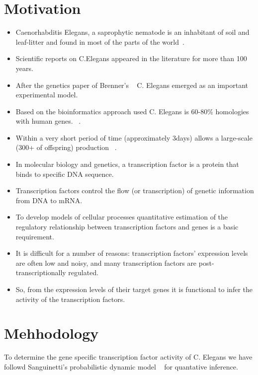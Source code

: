 \documentclass[12pt]{article}
\begin{document}
\maketitle


\section{Motivation}
	\begin{itemize}
	  \item Caenorhabditis Elegans, a saprophytic nematode is an inhabitant of soil and leaf-litter and found 
		in most of the parts of the world~\cite{hope}.
	  \item Scientific reports on C.Elegans appeared in the literature for more than 100 years.
	  \item After the genetics paper of Brenner's ~\cite{brenner} C. Elegans emerged as an important experimental model.
	  \item Based on the bioinformatics approach used C. Elegans is 60-80\% homologies with human genes. ~\cite{kaletta}.
	  \item Within a very short period of time (approximately 3days) allows a large-scale (300+ of offspring) production ~\cite{hope}. 
	  \item In molecular biology and genetics, a transcription factor is a protein that binds to specific DNA sequence.
	  \item Transcription factors control the flow (or transcription) of genetic information from DNA to mRNA. 
	  \item To develop models of cellular processes quantitative estimation of the regulatory relationship between transcription factors and genes is a basic requirement. 
	  \item It is difficult for a number of reasons: transcription factors’ expression levels are often low and noisy, and many transcription factors are post- transcriptionally regulated. 
	  \item So, from the expression levels of their target genes it is functional to infer the activity of the transcription factors.

	\end{itemize}

\section{Mehhodology}\label{mehhodology}
To determine the gene specific transcription factor activity of C. Elegans we have followd Sanguinetti's probabilistic
dynamic model ~\cite{sanguinetti:01} for quantative inference.
\end{document}

